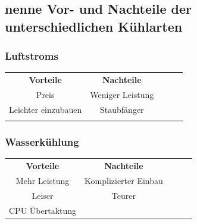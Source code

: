 \documentclass[a4paper]{article}
\begin{document}
    \subsection{\color{red}nenne Vor- und Nachteile der unterschiedlichen Kühlarten}\label{subsec:nenne-vor--und-nachteile-der-unterschiedlichen-kühlarten}

    \subsubsection{\color{codegreen}Luftstroms}
    \begin{center}
        \begin{tabular}{cclll}
            \cline{1-2}
            \multicolumn{1}{|c|}{\textbf{Vorteile}}                          & \multicolumn{1}{c|}{\textbf{Nachteile}}                      &  &  &  \\ \cline{1-2}
            \multicolumn{1}{|c|}{{\color[HTML]{32CB00} Preis}}               & \multicolumn{1}{c|}{{\color[HTML]{F56B00} Weniger Leistung}} &  &  &  \\ \cline{1-2}
            \multicolumn{1}{|c|}{{\color[HTML]{32CB00} Leichter einzubauen}} & \multicolumn{1}{c|}{{\color[HTML]{F56B00} Staubfänger}}      &  &  &  \\ \cline{1-2}
            \multicolumn{1}{l}{}                                             & \multicolumn{1}{l}{}                                         & & &
        \end{tabular}
    \end{center}

    \subsubsection{\color{codegreen}Wasserkühlung}
    \begin{center}
        \begin{tabular}{|c|clll}
            \cline{1-2}
            \textbf{Vorteile}                                            & \multicolumn{1}{c|}{\textbf{Nachteile}}                          & & & \\ \cline{1-2}
            {\color[HTML]{32CB00} Mehr Leistung}                         & \multicolumn{1}{c|}{{\color[HTML]{F56B00} Komplizierter Einbau}} &  &  &  \\ \cline{1-2}
            {\color[HTML]{32CB00} Leiser}                                & \multicolumn{1}{c|}{{\color[HTML]{F56B00} Teurer}}               &  &  &  \\ \cline{1-2}
            \multicolumn{1}{|l|}{{\color[HTML]{32CB00} CPU Übertaktung}} & \multicolumn{1}{l}{}                                             &  &  &  \\ \cline{1-1}
        \end{tabular}
    \end{center}
\end{document}
